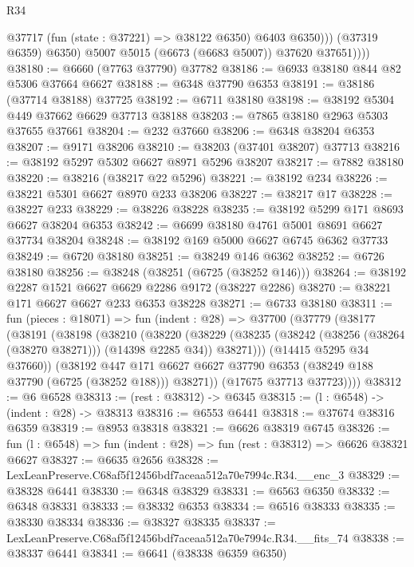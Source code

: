 \begin{lexlean}{R34}
\begin{coremodule}
                  @37717 (fun (state : @37221) => @38122 @6350) @6403 @6350)))
              (@37319 @6359)
              @6350)
            @5007
            @5015
            (@6673 (@6683 @5007))
            @37620
            @37651))))
@38180 := @6660 (@7763 @37790) @37782
@38186 := @6933 @38180 @844 @82 @5306 @37664 @6627
@38188 := @6348 @37790 @6353
@38191 := @38186 (@37714 @38188) @37725
@38192 := @6711 @38180
@38198 := @38192 @5304 @449 @37662 @6629 @37713 @38188
@38203 := @7865 @38180 @2963 @5303 @37655 @37661
@38204 := @232 @37660
@38206 := @6348 @38204 @6353
@38207 := @9171 @38206
@38210 := @38203 (@37401 @38207) @37713
@38216 := @38192 @5297 @5302 @6627 @8971 @5296 @38207
@38217 := @7882 @38180
@38220 := @38216 (@38217 @22 @5296)
@38221 := @38192 @234
@38226 := @38221 @5301 @6627 @8970 @233 @38206
@38227 := @38217 @17
@38228 := @38227 @233
@38229 := @38226 @38228
@38235 := @38192 @5299 @171 @8693 @6627 @38204 @6353
@38242 := @6699 @38180 @4761 @5001 @8691 @6627 @37734 @38204
@38248 := @38192 @169 @5000 @6627 @6745 @6362 @37733
@38249 := @6720 @38180
@38251 := @38249 @146 @6362
@38252 := @6726 @38180
@38256 := @38248 (@38251 (@6725 (@38252 @146)))
@38264 := @38192 @2287 @1521 @6627 @6629 @2286 @9172 (@38227 @2286)
@38270 := @38221 @171 @6627 @6627 @233 @6353 @38228
@38271 := @6733 @38180
@38311 := fun (pieces : @18071) =>
  fun (indent : @28) =>
  @37700
    (@37779
      (@38177
        (@38191
          (@38198
            (@38210
              (@38220
                (@38229
                  (@38235 (@38242 (@38256 (@38264 (@38270 @38271))) (@14398 @2285 @34)) @38271)))
              (@14415 @5295 @34 @37660))
            (@38192
              @447
              @171
              @6627
              @6627
              @37790
              @6353
              (@38249 @188 @37790 (@6725 (@38252 @188)))
              @38271))
          (@17675 @37713 @37723))))
@38312 := @6 @6528
@38313 := (rest : @38312) -> @6345
@38315 := (l : @6548) -> (indent : @28) -> @38313
@38316 := @6553 @6441
@38318 := @37674 @38316 @6359
@38319 := @8953 @38318
@38321 := @6626 @38319 @6745
@38326 := fun (l : @6548) => fun (indent : @28) => fun (rest : @38312) => @6626 @38321 @6627
@38327 := @6635 @2656
@38328 := LexLeanPreserve.C68af5f12456bdf7aceaa512a70e7994c.R34.__enc_3
@38329 := @38328 @6441
@38330 := @6348 @38329
@38331 := @6563 @6350
@38332 := @6348 @38331
@38333 := @38332 @6353
@38334 := @6516 @38333
@38335 := @38330 @38334
@38336 := @38327 @38335
@38337 := LexLeanPreserve.C68af5f12456bdf7aceaa512a70e7994c.R34.__fits_74
@38338 := @38337 @6441
@38341 := @6641 (@38338 @6359 @6350)

\end{coremodule}
\end{lexlean}
